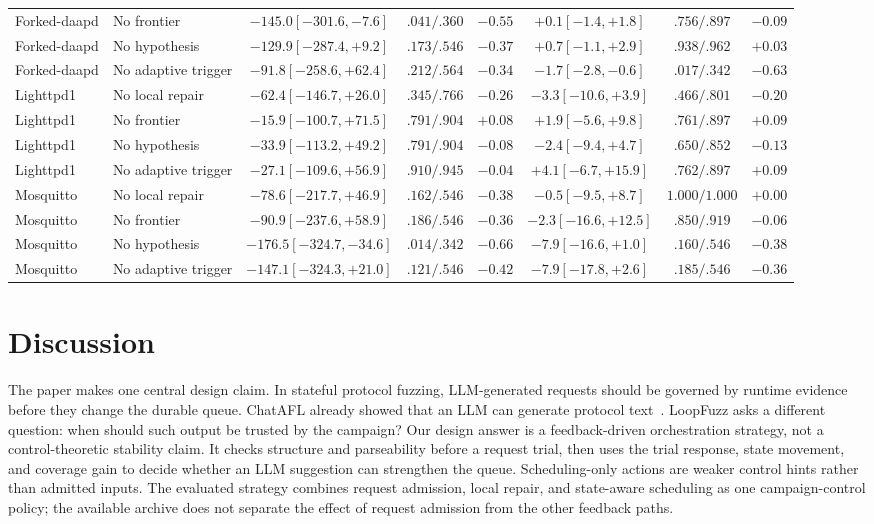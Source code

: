 \documentclass[final,5p,times,number]{elsarticle}
\begin{document}
\begin{table}[!t]
{{\begin{tabular}{l l c c c c c c}
Forked-daapd & No frontier & $-145.0 [-301.6,-7.6]$ & $.041/.360$ & $-0.55$ & $+0.1 [-1.4,+1.8]$ & $.756/.897$ & $-0.09$ \\
Forked-daapd & No hypothesis & $-129.9 [-287.4,+9.2]$ & $.173/.546$ & $-0.37$ & $+0.7 [-1.1,+2.9]$ & $.938/.962$ & $+0.03$ \\
Forked-daapd & No adaptive trigger & $-91.8 [-258.6,+62.4]$ & $.212/.564$ & $-0.34$ & $-1.7 [-2.8,-0.6]$ & $.017/.342$ & $-0.63$ \\
Lighttpd1 & No local repair & $-62.4 [-146.7,+26.0]$ & $.345/.766$ & $-0.26$ & $-3.3 [-10.6,+3.9]$ & $.466/.801$ & $-0.20$ \\
Lighttpd1 & No frontier & $-15.9 [-100.7,+71.5]$ & $.791/.904$ & $+0.08$ & $+1.9 [-5.6,+9.8]$ & $.761/.897$ & $+0.09$ \\
Lighttpd1 & No hypothesis & $-33.9 [-113.2,+49.2]$ & $.791/.904$ & $-0.08$ & $-2.4 [-9.4,+4.7]$ & $.650/.852$ & $-0.13$ \\
Lighttpd1 & No adaptive trigger & $-27.1 [-109.6,+56.9]$ & $.910/.945$ & $-0.04$ & $+4.1 [-6.7,+15.9]$ & $.762/.897$ & $+0.09$ \\
Mosquitto & No local repair & $-78.6 [-217.7,+46.9]$ & $.162/.546$ & $-0.38$ & $-0.5 [-9.5,+8.7]$ & $1.000/1.000$ & $+0.00$ \\
Mosquitto & No frontier & $-90.9 [-237.6,+58.9]$ & $.186/.546$ & $-0.36$ & $-2.3 [-16.6,+12.5]$ & $.850/.919$ & $-0.06$ \\
Mosquitto & No hypothesis & $-176.5 [-324.7,-34.6]$ & $.014/.342$ & $-0.66$ & $-7.9 [-16.6,+1.0]$ & $.160/.546$ & $-0.38$ \\
Mosquitto & No adaptive trigger & $-147.1 [-324.3,+21.0]$ & $.121/.546$ & $-0.42$ & $-7.9 [-17.8,+2.6]$ & $.185/.546$ & $-0.36$ \\
\bottomrule
\end{tabular}}
}
\end{table}

\section{Discussion}

The paper makes one central design claim. In stateful protocol fuzzing, LLM-generated requests should be governed by runtime evidence before they change the durable queue. ChatAFL already showed that an LLM can generate protocol text~\cite{chatafl}. LoopFuzz asks a different question: when should such output be trusted by the campaign? Our design answer is a feedback-driven orchestration strategy, not a control-theoretic stability claim. It checks structure and parseability before a request trial, then uses the trial response, state movement, and coverage gain to decide whether an LLM suggestion can strengthen the queue. Scheduling-only actions are weaker control hints rather than admitted inputs. The evaluated strategy combines request admission, local repair, and state-aware scheduling as one campaign-control policy; the available archive does not separate the effect of request admission from the other feedback paths.
\end{document}
